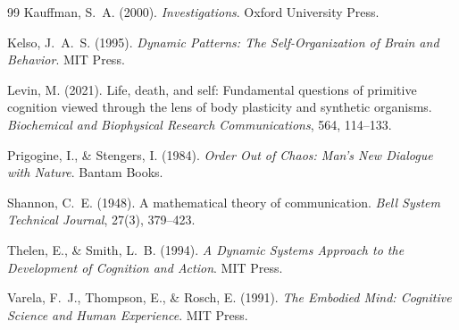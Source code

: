 \documentclass[11pt]{article}
\begin{document}
\begin{thebibliography}{99}
Kauffman, S.~A. (2000).
\textit{Investigations}.
Oxford University Press.

Kelso, J.~A.~S. (1995).
\textit{Dynamic Patterns: The Self-Organization of Brain and Behavior}.
MIT Press.

Levin, M. (2021).
Life, death, and self: Fundamental questions of primitive cognition viewed through the
lens of body plasticity and synthetic organisms.
\textit{Biochemical and Biophysical Research Communications}, 564, 114--133.

Prigogine, I., \& Stengers, I. (1984).
\textit{Order Out of Chaos: Man's New Dialogue with Nature}.
Bantam Books.

Shannon, C.~E. (1948).
A mathematical theory of communication.
\textit{Bell System Technical Journal}, 27(3), 379--423.

Thelen, E., \& Smith, L.~B. (1994).
\textit{A Dynamic Systems Approach to the Development of Cognition and Action}.
MIT Press.

Varela, F.~J., Thompson, E., \& Rosch, E. (1991).
\textit{The Embodied Mind: Cognitive Science and Human Experience}.
MIT Press.

\end{thebibliography}
\end{document}
